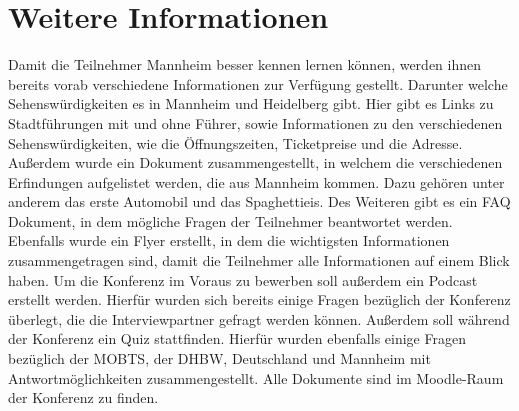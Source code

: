 \section{Weitere Informationen}
Damit die Teilnehmer Mannheim besser kennen lernen können, werden ihnen bereits vorab verschiedene Informationen zur Verfügung gestellt. Darunter welche Sehenswürdigkeiten es in Mannheim und Heidelberg gibt. Hier gibt es Links zu Stadtführungen mit und ohne Führer, sowie Informationen zu den verschiedenen Sehenswürdigkeiten, wie die Öffnungszeiten, Ticketpreise und die Adresse. Außerdem wurde ein Dokument zusammengestellt, in welchem die verschiedenen Erfindungen aufgelistet werden, die aus Mannheim kommen. Dazu gehören unter anderem das erste Automobil und das Spaghettieis. Des Weiteren gibt es ein FAQ Dokument, in dem mögliche Fragen der Teilnehmer beantwortet werden. Ebenfalls wurde ein Flyer erstellt, in dem die wichtigsten Informationen zusammengetragen sind, damit die Teilnehmer alle Informationen auf einem Blick haben. Um die Konferenz im Voraus zu bewerben soll außerdem ein Podcast erstellt werden. Hierfür wurden sich bereits einige Fragen bezüglich der Konferenz überlegt, die die Interviewpartner gefragt werden können. Außerdem soll während der Konferenz ein Quiz stattfinden. Hierfür wurden ebenfalls einige Fragen bezüglich der MOBTS, der DHBW, Deutschland und Mannheim mit Antwortmöglichkeiten zusammengestellt. Alle Dokumente sind im Moodle-Raum der Konferenz zu finden.


